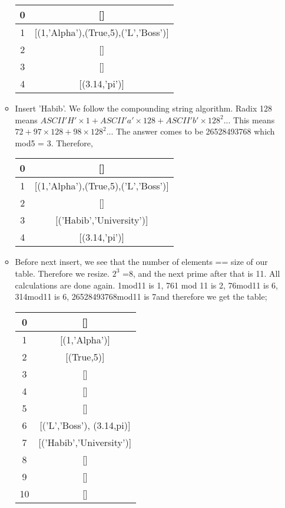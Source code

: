 \documentclass{article}
\begin{document}
\begin{enumerate}
\begin{itemize}
				\begin{center}
					\begin{tabular}{ |c|c| } 
						\hline
						0 & []   \\ 
						\hline
						1 &	[(1,'Alpha'),(True,5),('L','Boss')] \\
						\hline 
						2 & []  \\ 
						\hline
						3&[]\\
						\hline
						4&[(3.14,'pi')]\\
						\hline
					\end{tabular}
				\end{center}
		\item Insert 'Habib'. We follow the compounding string algorithm. Radix 128 means $ASCII 'H' \times 1 + ASCII 'a' \times 128 + ASCII 'b' \times128^2 ...$ This means $72 + 97\times 128 + 98 \times 128^2$... The answer comes to be 26528493768 which mod5 = 3. Therefore,
				\begin{center}
					\begin{tabular}{ |c|c| } 
						\hline
						0 & []   \\ 
						\hline
						1 &	[(1,'Alpha'),(True,5),('L','Boss')] \\
						\hline 
						2 & []  \\ 
						\hline
						3&[('Habib','University')]\\
						\hline
						4&[(3.14,'pi')]\\
						\hline
					\end{tabular}
				\end{center}
			\item Before next insert, we see that the number of elements == size of our table. Therefore we resize. $2^3$ =8, and the next prime after that is 11. All calculations are done again. 1mod11 is 1, 761 mod 11 is 2, 76mod11 is 6, 314mod11 is 6, 26528493768mod11 is 7and therefore we get the table;
					\begin{center}
						\begin{tabular}{ |c|c| } 
							\hline
							0 & []   \\ 
							\hline
							1 &	[(1,'Alpha')] \\
							\hline 
							2 & [(True,5)]  \\ 
							\hline
							3&[]\\
							\hline
							4&[]\\
							\hline
							5&[]\\
							\hline
							6&[('L','Boss'), (3.14,pi)]\\
							\hline
							7&[('Habib','University')]\\
							\hline
							8&[]\\
							\hline
							9&[]\\
							\hline
							10&[]\\
							\hline
						\end{tabular}
					\end{center}
					

\end{itemize}
\end{enumerate}
\end{document}
